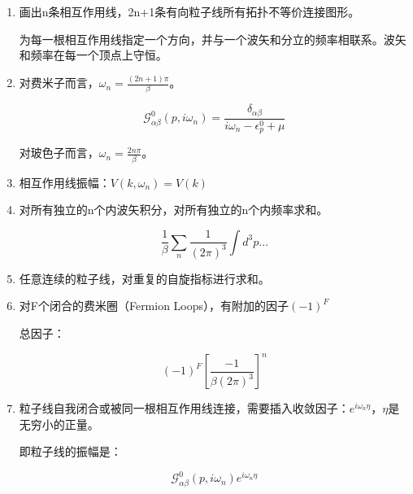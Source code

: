\begin{enumerate}
\item

画出n条相互作用线，2n+1条有向粒子线所有拓扑不等价连接图形。

为每一根相互作用线指定一个方向，并与一个波矢和分立的频率相联系。波矢和频率在每一个顶点上守恒。

\item

对费米子而言，$\omega_n = \frac{(2n +1)\pi}{ \beta}$。

\begin{equation*}
\mathcal{G}_{\alpha \beta}^0 (p, i\omega_n) = \frac{\delta_{\alpha
\beta }}{i \omega_n - \epsilon_p^0 + \mu}
\end{equation*}


对玻色子而言，$\omega_n = \frac{2n\pi}{ \beta}$。
 
\item

相互作用线振幅：$V(k, \omega_n) = V(k)$

\item

对所有独立的n个内波矢积分，对所有独立的n个内频率求和。

\begin{equation*}
\frac{1}{\beta} \sum\limits_n \frac{1}{(2 \pi)^3} \int d^3 p ...
\end{equation*}

\item 

任意连续的粒子线，对重复的自旋指标进行求和。

\item 

对F个闭合的费米圈（Fermion Loops），有附加的因子$(-1)^F$

总因子：

\begin{equation*}
(-1)^F \left[  \frac{-1}{\beta (2 \pi)^3} \right]^n
\end{equation*}

\item

粒子线自我闭合或被同一根相互作用线连接，需要插入收敛因子：$e^{i \omega_n \eta}$，$\eta$是无穷小的正量。

即粒子线的振幅是：

\begin{equation*}
\mathcal{G}^0_{\alpha \beta}  (p, i \omega_n) e^{i \omega_n \eta}
\end{equation*}

\end{enumerate}


